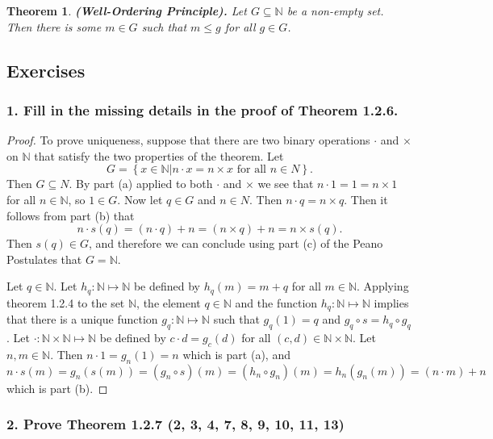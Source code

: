 \documentclass{article}
\newtheorem{theorem}{Theorem}
\newcommand{\N}{\mathbb{N}}
\begin{document}
\begin{theorem}
	\textbf{(Well-Ordering Principle).} Let $G \subseteq \N$ be a non-empty set. Then there is some $m \in G$ such that $m \le g$ for all $g \in G$.
\end{theorem}

\subsection*{Exercises}

\subsubsection*{1. Fill in the missing details in the proof of Theorem 1.2.6.}

\begin{proof}
	To prove uniqueness, suppose that there are two binary operations $\cdot$ and $\times$ on $\N$ that satisfy the two properties of the theorem. Let \[G = \left\{x \in \N | n \cdot x = n \times x \text{ for all } n \in N\right\}.\]
	Then $G \subseteq N$. By part (a) applied to both $\cdot$ and $\times$ we see that $n \cdot 1 = 1 = n \times 1$ for all $n \in \N$, so $1 \in G$. Now let $q \in G$ and $n \in N$. Then $n \cdot q = n \times q$. Then it follows from part (b) that \[n \cdot s(q) = (n \cdot q) + n = (n \times q) + n = n \times s(q).\] Then $s(q) \in G$, and therefore we can conclude using part (c) of the Peano Postulates that $G = \N$.

	Let $q \in \N$. Let $h_q: \N \mapsto \N$ be defined by $h_q(m) = m + q$ for all $m \in \N$. Applying theorem 1.2.4 to the set $\N$, the element $q \in \N$ and the function $h_q: \N \mapsto \N$ implies that there is a unique function $g_q: \N \mapsto \N$ such that $g_q(1) = q$ and $g_q \circ s = h_q \circ g_q$. Let $\cdot: \N \times \N \mapsto \N$ be defined by $c \cdot d = g_c(d)$ for all $(c,d)\in \N \times \N$. Let $n,m \in \N$. Then $n \cdot 1 = g_n(1) = n$ which is part (a), and $n \cdot s(m) = g_n(s(m)) = (g_n \circ s)(m) = (h_n \circ g_n)(m) = h_n(g_n(m)) = (n \cdot m) + n$ which is part (b).
\end{proof}

\subsubsection*{2. Prove Theorem 1.2.7 (2, 3, 4, 7, 8, 9, 10, 11, 13)}
\end{document}
